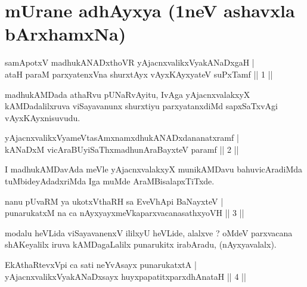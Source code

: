\section*{mUrane adhAyxya (1neV ashavxla bArxhamxNa)}


\begin{shl}
samApotxV madhukANADxthoVR yAjacnxvalikxVyakANaDxgaH |\\
ataH paraM parxyatenxVna shurxtAyx vAyxKAyxyateV suPxTamf \hfill || 1 || 
\end{shl}

\begin{artha}
madhukAMDada athaRvu pUNaRvAyitu, IvAga yAjacnxvalakxyX kAMDadalilxruva viSayavanunx shurxtiyu parxyatanxdiMd sapxSaTxvAgi vAyxKAyxnisuvudu.
\end{artha}


\begin{shl}
yAjacnxvalikxVyameVtasAmxnamxdhukANADxdananatxramf |\\
kANaDxM vicAraBUyiSaThxmadhunA\s \s raBayxteV paramf \hfill || 2 ||
\end{shl}

\begin{artha}
I madhukAMDavAda meVle yAjacnxvalakxyX munikAMDavu bahuvicAradiMda tuMbideyAdadxriMda Iga muMde AraMBisalapxTiTxde.
\end{artha}



\begin{shl}
nanu pUvaRM ya ukotxV\s thaRH sa EveVhApi BaNayxteV |\\
punarukatxM na ca nAyxyayxmeVkaparxvacanasathxyoVH \hfill || 3 || 
\end{shl}

\begin{artha}
modalu heVLida viSayavanenxV ililxyU heVLide, alalxve ? oMdeV parxvacana shAKeyalilx iruva kAMDagaLalilx punarukitx irabAradu, (nAyxyavalalx).
\end{artha}


\begin{shl}
EkAthaRtevxV\s pi ca sati neYvAsayx punarukatxtA |\\
yAjacnxvalikxVyakANaDxsayx huyxpapatitxparxdhAnataH \hfill || 4 ||
\end{shl}

